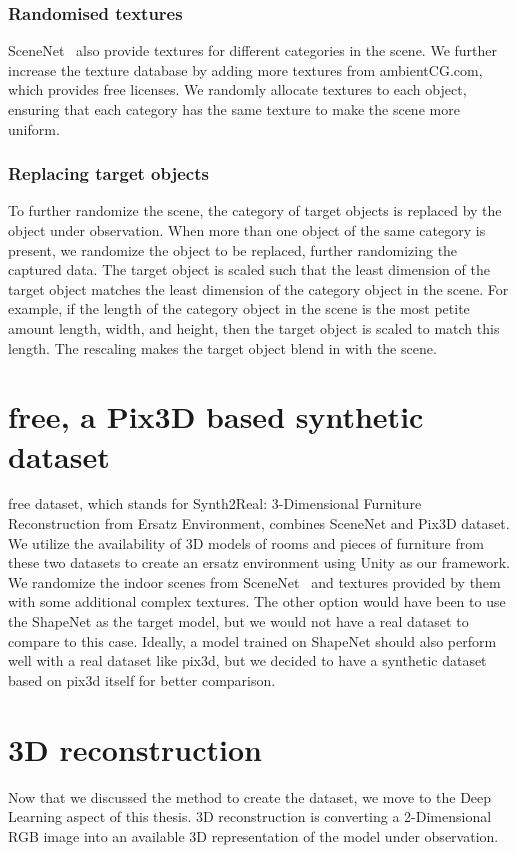 \subsubsection{Randomised textures}
SceneNet~\cite{McCormac:etal:ICCV2017} also provide textures for different categories in the scene.
We further increase the texture database by adding more textures from ambientCG.com, which provides free licenses.
We randomly allocate textures to each object, ensuring that each category has the same texture to make the scene more uniform.

\subsubsection{Replacing target objects}
To further randomize the scene, the category of target objects is replaced by the object under observation.
When more than one object of the same category is present, we randomize the object to be replaced, further randomizing the captured data.
The target object is scaled such that the least dimension of the target object matches the least dimension of the category object in the scene.
For example, if the length of the category object in the scene is the most petite amount length, width, and height, then the target object is scaled to match this length.
The rescaling makes the target object blend in with the scene.

\section{\gls{free}, a Pix3D based synthetic dataset}\label{sec:s2r:3d-free-a-pix3d-based-synthetic-dataset}

\gls{free} dataset, which stands for Synth2Real: 3-Dimensional Furniture Reconstruction from Ersatz Environment, combines SceneNet and Pix3D dataset.
We utilize the availability of 3D models of rooms and pieces of furniture from these two datasets to create an ersatz environment using Unity as our framework.
We randomize the indoor scenes from SceneNet~\cite{McCormac:etal:ICCV2017} and textures provided by them with some additional complex textures.
The other option would have been to use the ShapeNet as the target model, but we would not have a real dataset to compare to this case.
Ideally, a model trained on ShapeNet should also perform well with a real dataset like pix3d, but we decided to have a synthetic dataset based on pix3d itself for better comparison.

\section{3D reconstruction}\label{sec:3D reconstruction}
Now that we discussed the method to create the dataset, we move to the Deep Learning aspect of this thesis.
3D reconstruction is converting a 2-Dimensional RGB image into an available 3D representation of the model under observation.

